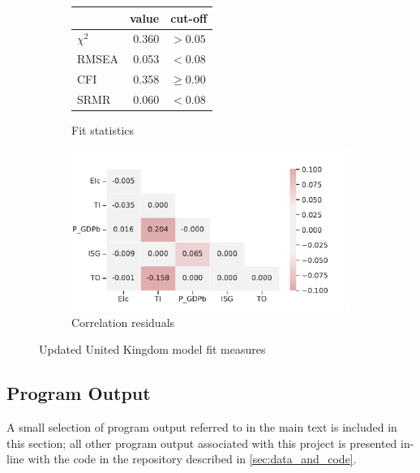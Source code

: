 \documentclass[11pt,a4paper]{article}
\begin{document}
\begin{figure}[htbp]
\begin{subfigure}{0.4\textwidth}
\centering
\begin{tabular}{lrl}
\toprule
{} &  value &      cut-off \\
\midrule
$\chi^2$ &  0.360 &     $> 0.05$ \\
RMSEA    &  0.053 &      $<0.08$ \\
CFI      &  0.358 &  $\geq 0.90$ \\
SRMR     &  0.060 &      $<0.08$ \\
\bottomrule
\end{tabular}
\caption{Fit statistics}
\label{tab:updated_fit_statistics}
\end{subfigure}
\begin{subfigure}{0.6\textwidth}
\centering
\includegraphics[width=\textwidth]{./plots/gbr_correlation_residuals.pdf}
\caption{Correlation residuals}
\label{fig:updated_fit_residuals}
\end{subfigure}
\caption{Updated United Kingdom model fit measures}
\label{fig:gbr_fit}
\end{figure}

\FloatBarrier

\subsection{Program Output}\label{sec:program_output}

A small selection of program output referred to in the main text is included in this section; all other program output associated with this project is presented in-line with the code in the repository described in \cref{sec:data_and_code}.

\pagestyle{empty}
\end{document}
